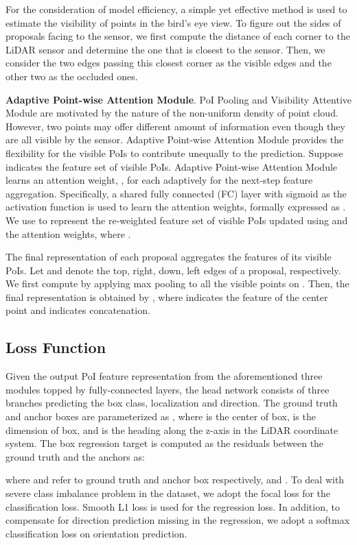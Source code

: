 \documentclass[runningheads]{llncs}
\begin{document}
For the consideration of model efficiency, a simple yet effective method is used to estimate the visibility of points in the bird's eye view. To figure out the sides of proposals facing to the sensor, we first compute the distance of each corner to the LiDAR sensor and determine the one that is closest to the sensor. Then, we consider the two edges passing this closest corner as the visible edges and the other two as the occluded ones. 

\noindent\textbf{Adaptive Point-wise Attention Module}.
PoI Pooling and Visibility Attentive Module are motivated by the nature of the non-uniform density of point cloud. However, two points may offer different amount of information even though they are all visible by the sensor. Adaptive Point-wise Attention Module provides the flexibility for the visible PoIs to contribute unequally to the prediction. Suppose  indicates the feature set of visible PoIs. Adaptive Point-wise Attention Module learns an attention weight, , for each  adaptively for the next-step feature aggregation. Specifically, a shared fully connected (FC) layer with sigmoid as the activation function is used to learn the attention weights, formally expressed as . We use  to represent the re-weighted feature set of visible PoIs updated using  and the attention weights, where .
 
The final representation of each proposal aggregates the features of its visible PoIs. Let  and  denote the top, right, down, left edges of a proposal, respectively. We first compute  by applying max pooling to all the visible points on . Then, the final representation is obtained by , where  indicates the feature of the center point and  indicates concatenation.

\subsection{Loss Function}
Given the output PoI feature representation from the aforementioned three modules topped by fully-connected layers, the head network consists of three branches predicting the box class, localization and direction. The ground truth and anchor boxes are parameterized as , where  is the center of box,  is the dimension of box, and  is the heading along the z-axis in the LiDAR coordinate system. The box regression target is computed as the residuals between the ground truth and the anchors as:

 

where  and  refer to ground truth and anchor box respectively, and . To deal with severe class imbalance problem in the dataset, we adopt the focal loss \cite{lin2017focal} for the classification loss. Smooth L1 loss \cite{Girshick_2014_CVPR} is used for the regression loss. In addition, to compensate for direction prediction missing in the regression, we adopt a softmax classification loss on orientation prediction. 
\end{document}
